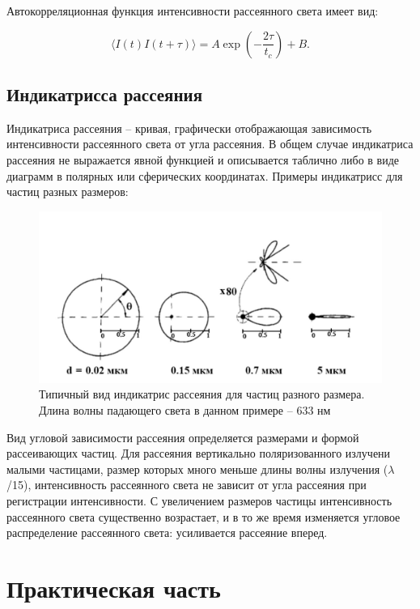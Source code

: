 \documentclass[a4paper,12pt]{article} %
\begin{document}
Автокорреляционная функция интенсивности рассеянного света имеет вид:

\begin{equation}
\langle I(t) I(t+\tau)\rangle=A \exp \left(-\frac{2 \tau}{t_{c}}\right)+B.
\end{equation}

\subsection{Индикатрисса рассеяния}

Индикатриса рассеяния – кривая, графически отображающая зависимость интенсивности рассеянного света от угла рассеяния. В общем случае индикатриса рассеяния не выражается явной функцией и описывается таблично либо в виде диаграмм в полярных или сферических координатах. Примеры индикатрисс для частиц разных размеров:

\begin{center}
\begin{figure}[h]
\includegraphics[width=1\textwidth]{Rj6DFQ7JDjk.jpg}
\caption{Типичный вид индикатрис рассеяния для частиц разного размера. Длина
волны падающего света в данном примере – 633 нм}
\end{figure}
\end{center}
Вид угловой зависимости рассеяния определяется размерами и формой рассеивающих частиц. Для рассеяния вертикально поляризованного излучени малыми частицами, размер которых много меньше длины волны излучения ($\lambda$/15), интенсивность рассеянного света не зависит от угла рассеяния при регистрации интенсивности. С увеличением размеров частицы интенсивность рассеянного света существенно возрастает, и в то же время изменяется угловое распределение рассеянного света: усиливается рассеяние вперед.
\clearpage


\section{Практическая часть}
\end{document}
